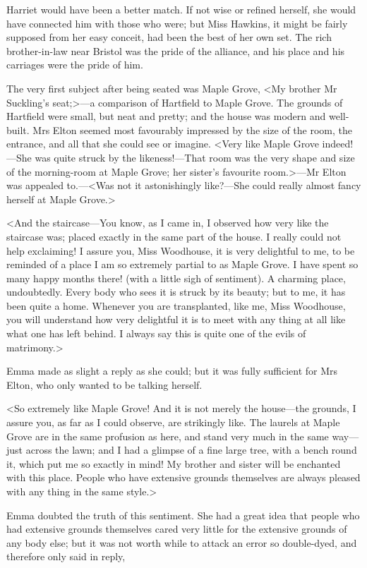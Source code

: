 Harriet would have been a better match. If not wise or refined herself, she would have connected him with those who were; but Miss Hawkins, it might be fairly supposed from her easy conceit, had been the best of her own set. The rich brother-in-law near Bristol was the pride of the alliance, and his place and his carriages were the pride of him.

The very first subject after being seated was Maple Grove, <My brother Mr Suckling's seat;>—a comparison of Hartfield to Maple Grove. The grounds of Hartfield were small, but neat and pretty; and the house was modern and well-built. Mrs Elton seemed most favourably impressed by the size of the room, the entrance, and all that she could see or imagine. <Very like Maple Grove indeed!—She was quite struck by the likeness!—That room was the very shape and size of the morning-room at Maple Grove; her sister's favourite room.>—Mr Elton was appealed to.—<Was not it astonishingly like?—She could really almost fancy herself at Maple Grove.>

<And the staircase—You know, as I came in, I observed how very like the staircase was; placed exactly in the same part of the house. I really could not help exclaiming! I assure you, Miss Woodhouse, it is very delightful to me, to be reminded of a place I am so extremely partial to as Maple Grove. I have spent so many happy months there! (with a little sigh of sentiment). A charming place, undoubtedly. Every body who sees it is struck by its beauty; but to me, it has been quite a home. Whenever you are transplanted, like me, Miss Woodhouse, you will understand how very delightful it is to meet with any thing at all like what one has left behind. I always say this is quite one of the evils of matrimony.>

Emma made as slight a reply as she could; but it was fully sufficient for Mrs Elton, who only wanted to be talking herself.

<So extremely like Maple Grove! And it is not merely the house—the grounds, I assure you, as far as I could observe, are strikingly like. The laurels at Maple Grove are in the same profusion as here, and stand very much in the same way—just across the lawn; and I had a glimpse of a fine large tree, with a bench round it, which put me so exactly in mind! My brother and sister will be enchanted with this place. People who have extensive grounds themselves are always pleased with any thing in the same style.>

Emma doubted the truth of this sentiment. She had a great idea that people who had extensive grounds themselves cared very little for the extensive grounds of any body else; but it was not worth while to attack an error so double-dyed, and therefore only said in reply,

